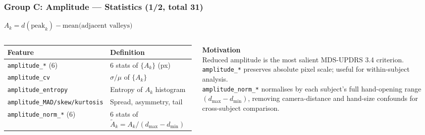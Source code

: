 \documentclass[aspectratio=169]{beamer}
\begin{document}
\begin{frame}
    \frametitle{Group C: Amplitude --- Statistics (1/2, total 31)}
    \scriptsize
    $A_k = d(\text{peak}_k) - \text{mean(adjacent valleys)}$\\[0.2em]
    \begin{columns}[T]
        \renewcommand{\arraystretch}{1.1}
        \begin{tabular}{p{4.2cm}p{2.8cm}}
            \toprule
            \textbf{Feature} & \textbf{Definition} \\
            \midrule
            \texttt{amplitude\_*} (6) & 6 stats of $\{A_k\}$ (px) \\
            \texttt{amplitude\_cv} & $\sigma/\mu$ of $\{A_k\}$ \\
            \texttt{amplitude\_entropy} & Entropy of $A_k$ histogram \\
            \texttt{amplitude\_MAD/skew/kurtosis} & Spread, asymmetry, tail \\
            \midrule
            \texttt{amplitude\_norm\_*} (6) & 6 stats of $\tilde{A}_k = A_k/(d_\text{max}{-}d_\text{min})$ \\
            \bottomrule
        \end{tabular}

        \textbf{Motivation}\\[0.3em]
        Reduced amplitude is the most salient MDS-UPDRS 3.4 criterion.\\[0.4em]
        \texttt{amplitude\_*} preserves absolute pixel scale; useful for within-subject analysis.\\[0.4em]
        \texttt{amplitude\_norm\_*} normalises by each subject's full hand-opening range $(d_\text{max}{-}d_\text{min})$, removing camera-distance and hand-size confounds for cross-subject comparison.
    \end{columns}
\end{frame}
\end{document}
